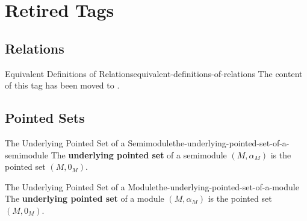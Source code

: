 \section{Retired Tags}\label{section-retired-tags}
\subsection{Relations}\label{subsection-retired-tags-relations}
\begin{oldtag}{Equivalent Definitions of Relations}{equivalent-definitions-of-relations}%
    The content of this tag has been moved to .
\end{oldtag}
\subsection{Pointed Sets}\label{subsection-retired-tags-pointed-sets}
\begin{oldtag}{The Underlying Pointed Set of a Semimodule}{the-underlying-pointed-set-of-a-semimodule}%
    The \textbf{underlying pointed set} of a semimodule $(M,\alpha_{M})$ is the pointed set $(M,0_{M})$.
\end{oldtag}
\begin{oldtag}{The Underlying Pointed Set of a Module}{the-underlying-pointed-set-of-a-module}%
    The \textbf{underlying pointed set} of a module $(M,\alpha_{M})$ is the pointed set $(M,0_{M})$.
\end{oldtag}

